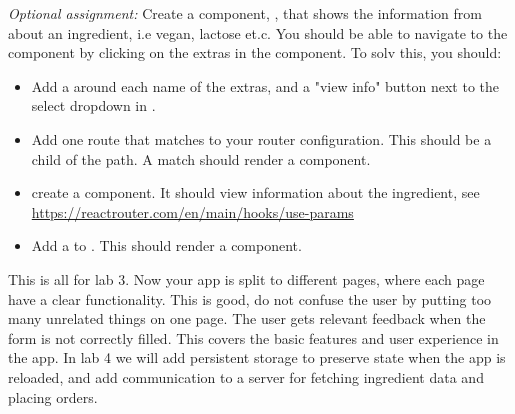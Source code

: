\documentclass[fleqn, article, a4paper]{memoir}
\begin{document}
\begin{Assignments}
\item \emph{Optional assignment:} Create a component, , that shows the information from  about an ingredient, i.e vegan, lactose et.c. You should be able to navigate to the  component by clicking on the extras in the  component. To solv this, you should:
\begin{itemize}
  \item Add a  around each name of the extras, and a "view info" button next to the select dropdown in .
  \item Add one route that matches  to your router configuration. This should be a child of the  path. A match should render a  component.
  \item create a  component. It should view information about the  ingredient, see \url{https://reactrouter.com/en/main/hooks/use-params}
  \item Add a  to . This should render a  component.
\end{itemize}

\item This is all for lab 3. Now your app is split to different pages, where each page have a clear functionality. This is good, do not confuse the user by putting too many unrelated things on one page. The user gets relevant feedback when the form is not correctly filled. This covers the basic features and user experience in the app. In lab 4 we will add persistent storage to preserve state when the app is reloaded, and add communication to a server for fetching ingredient data and placing orders.

\end{Assignments}


\end{document}
